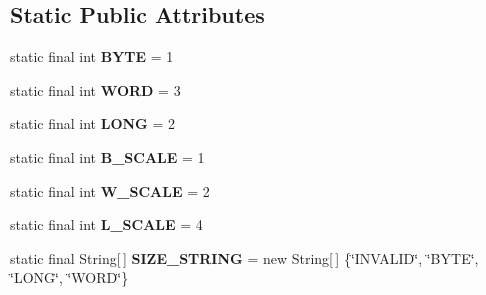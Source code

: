\subsection*{Static Public Attributes}
\begin{DoxyCompactItemize}
\item 
\hypertarget{classcom_1_1wmbest_1_1jenesis_1_1m68k_1_1instructions_1_1Instruction_a8881c49e1cdfab06fd0d1bd75768225d}{static final int {\bfseries B\-Y\-T\-E} = 1}\label{classcom_1_1wmbest_1_1jenesis_1_1m68k_1_1instructions_1_1Instruction_a8881c49e1cdfab06fd0d1bd75768225d}

\item 
\hypertarget{classcom_1_1wmbest_1_1jenesis_1_1m68k_1_1instructions_1_1Instruction_a097711cc1f7462c39374f07703dc460e}{static final int {\bfseries W\-O\-R\-D} = 3}\label{classcom_1_1wmbest_1_1jenesis_1_1m68k_1_1instructions_1_1Instruction_a097711cc1f7462c39374f07703dc460e}

\item 
\hypertarget{classcom_1_1wmbest_1_1jenesis_1_1m68k_1_1instructions_1_1Instruction_a801fe1a92552f4504ce9ee196533d34b}{static final int {\bfseries L\-O\-N\-G} = 2}\label{classcom_1_1wmbest_1_1jenesis_1_1m68k_1_1instructions_1_1Instruction_a801fe1a92552f4504ce9ee196533d34b}

\item 
\hypertarget{classcom_1_1wmbest_1_1jenesis_1_1m68k_1_1instructions_1_1Instruction_a75c7a424c091b6791710e3d3fb4f76e5}{static final int {\bfseries B\-\_\-\-S\-C\-A\-L\-E} = 1}\label{classcom_1_1wmbest_1_1jenesis_1_1m68k_1_1instructions_1_1Instruction_a75c7a424c091b6791710e3d3fb4f76e5}

\item 
\hypertarget{classcom_1_1wmbest_1_1jenesis_1_1m68k_1_1instructions_1_1Instruction_ad183a8d7ad9ad5aedfa491d8aa6157ff}{static final int {\bfseries W\-\_\-\-S\-C\-A\-L\-E} = 2}\label{classcom_1_1wmbest_1_1jenesis_1_1m68k_1_1instructions_1_1Instruction_ad183a8d7ad9ad5aedfa491d8aa6157ff}

\item 
\hypertarget{classcom_1_1wmbest_1_1jenesis_1_1m68k_1_1instructions_1_1Instruction_aa710c7bd1465591dd3226e3c11c9fdaf}{static final int {\bfseries L\-\_\-\-S\-C\-A\-L\-E} = 4}\label{classcom_1_1wmbest_1_1jenesis_1_1m68k_1_1instructions_1_1Instruction_aa710c7bd1465591dd3226e3c11c9fdaf}

\item 
\hypertarget{classcom_1_1wmbest_1_1jenesis_1_1m68k_1_1instructions_1_1Instruction_ac71aceb924125caa4203bcc10fd149f3}{static final String\mbox{[}$\,$\mbox{]} {\bfseries S\-I\-Z\-E\-\_\-\-S\-T\-R\-I\-N\-G} = new String\mbox{[}$\,$\mbox{]} \{\char`\"{}I\-N\-V\-A\-L\-I\-D\char`\"{}, \char`\"{}B\-Y\-T\-E\char`\"{}, \char`\"{}L\-O\-N\-G\char`\"{}, \char`\"{}W\-O\-R\-D\char`\"{}\}}\label{classcom_1_1wmbest_1_1jenesis_1_1m68k_1_1instructions_1_1Instruction_ac71aceb924125caa4203bcc10fd149f3}

\end{DoxyCompactItemize}
